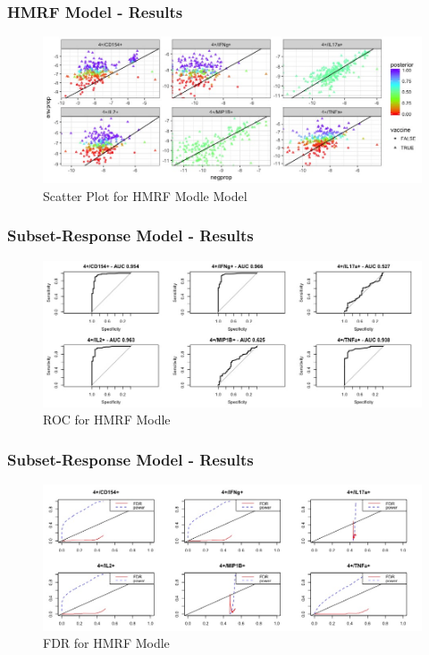 \documentclass{beamer}
\theoremstyle{definition}
\begin{document}

\begin{frame}
\frametitle{HMRF Model - Results}
\begin{figure}[]
\includegraphics[width=11 cm]{figures/HMRFscatter2} \caption{Scatter Plot for HMRF Modle Model}
\end{figure}
\end{frame}


\begin{frame}
\frametitle{Subset-Response Model - Results}
\begin{figure}[]
\includegraphics[width=11 cm]{figures/HMRFroc2} \caption{ROC for HMRF Modle}
\end{figure}
\end{frame}


\begin{frame}
\frametitle{Subset-Response Model - Results}
\begin{figure}[]
\includegraphics[width=12 cm]{figures/HMRFfdr2} \caption{FDR for HMRF Modle}
\end{figure}
\end{frame}
\end{document}
